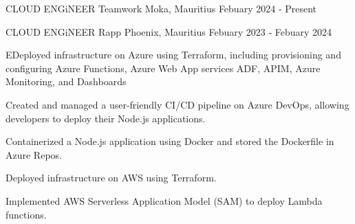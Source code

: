 

\begin{cventries}

  \cventry
    {CLOUD ENGiNEER} %
    {Teamwork} %
    {Moka, Mauritius} %
    {Febuary 2024 ‑ Present} %
    {
    }

  \cventry
    {CLOUD ENGiNEER} %
    {Rapp} %
    {Phoenix, Mauritius} %
    {Febuary 2023 ‑ Febuary 2024} %
    {
      \begin{cvitems} %
        \item {EDeployed infrastructure on Azure using Terraform, including provisioning and configuring Azure Functions, Azure Web App services ADF, APIM,
        Azure Monitoring, and Dashboards}
        \item {Created and managed a user‑friendly CI/CD pipeline on Azure DevOps, allowing developers to deploy their Node.js applications.}
        \item {Containerized a Node.js application using Docker and stored the Dockerfile in Azure Repos.}
        \item {Deployed infrastructure on AWS using Terraform.}
        \item {Implemented AWS Serverless Application Model (SAM) to deploy Lambda functions.}
      \end{cvitems}
    }


\end{cventries}
